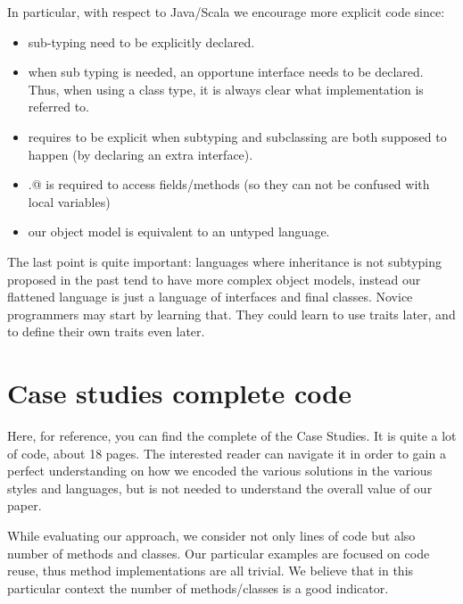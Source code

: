 In particular, with respect to Java/Scala we encourage more explicit code since:
\begin{itemize}
\item sub-typing need to be explicitly declared.
\item when sub typing is needed, an opportune interface needs to be declared. Thus, when using a class type, it is always clear what implementation is referred to.
\item \name requires to be explicit when subtyping and subclassing are both supposed to happen (by declaring an extra interface).
\item \Q@this.@ is required to access fields/methods (so they can not be confused with local variables)
\item our object model is equivalent to an untyped language.
\end{itemize}
The last point is quite important: languages where inheritance is not subtyping proposed in the past tend to have more complex object models, instead 
our flattened language is just a language of interfaces and final classes. Novice programmers may start by learning that. They could learn to use traits later, and to define their own traits even later.

\section{Case studies complete code} 

Here, for reference, you can find the complete
of the Case Studies.
It is quite a lot of code, about 18 pages. The interested reader
can navigate it in order to gain a perfect understanding on
how we encoded the various solutions in the various styles and languages,
but is not needed to understand the overall value of our paper.

While evaluating our approach, we consider not only lines of code but also number of methods and classes.
Our particular examples are focused on code reuse, thus method implementations are all trivial.
We believe that in this particular context the number of methods/classes is a good indicator.



